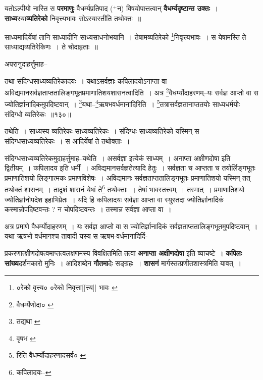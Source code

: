 \documentclass[article,12pt,a4paper]{memoir}
\newcommand{\add}[1]{($^{+}$#1)}
\begin{document}
	  \pstart यतोऽल्पीयो नास्ति स \textbf{परमाणुः} वैधर्म्यप्रतिपाद \add{न} विषयोपात्तत्वान् \textbf{वैधर्म्यदृष्टान्त उक्तः} । \textbf{साध्य}स्या\textbf{व्यतिरेको} निवृत्त्यभावः सोऽस्यास्तीति तथोक्तः ॥
	\pend
      \leavevmode{}
	  \bigskip
	  \begingroup
	

	  \pstart साध्यमादिर्येषां तानि साध्यादीनि साध्यसाधनोभयानि । तेषामव्यतिरेको \footnote{०रेको वृत्त्य० \cite{dp-msA} \cite{dp-edP} \cite{dp-edH} \cite{dp-edN} ०रेको निवृत्ता[[त्त्य]] भावः \cite{dp-msB}}निवृत्त्यभावः । स येषामस्ति ते साध्याद्यव्यतिरेकिणः । ते चोदाहृताः ॥
	\pend
       

	  \pstart अपरानुदाहर्त्तुमाह--
	\pend
       
	  \bigskip
	  \begingroup
	

	  \pstart तथा संदिग्धसाध्यव्यतिरेकादयः । यथाऽसर्वज्ञाः कपिलादयोऽनाप्ता वा अविद्यमानसर्वज्ञताप्ततालिङ्गभूतप्रमाणातिशयशासनत्वादिति । अत्र \footnote{वैधर्म्येणोदा० \cite{dp-msC}}वैधर्म्योदाहरणम्--यः सर्वज्ञ आप्तो वा स ज्योतिर्ज्ञानादिकमुपदिष्टवान् । \footnote{तद्यथा \cite{dp-msB} \cite{dp-msD} \cite{dp-edP} \cite{dp-edH} \cite{dp-edE} \cite{dp-edN}}यथा--\footnote{वृषभ \cite{dp-msC}}ऋषभवर्धमानादिरिति । \footnote{रिति वैधर्म्योदाहरणादसर्व० \cite{dp-msC}}तत्रासर्वज्ञतानाप्ततयोः साध्यधर्मयोः संदिग्धो व्यतिरेकः ॥१३०॥
	\pend
      
	  \endgroup
	 

	  \pstart तथेति । साध्यस्य व्यतिरेकः साध्यव्यतिरेकः । संदिग्धः साध्यव्यतिरेको यस्मिन् स संदिग्धसाध्यव्यतिरेकः । स आदिर्येषां ते तथोक्ताः ।
	\pend
       

	  \pstart संदिग्धसाध्यव्यतिरेकमुदाहर्त्तुमाह--यथेति । असर्वज्ञा इत्येकं साध्यम् । अनाप्ता अक्षीणदोषा इति द्वितीयम् । कपिलादय इति धर्मीं । अविद्यमानसर्वज्ञतेत्यादि हेतुः । सर्वज्ञता च आप्तता च तयोर्लिङ्गभूतः प्रमाणातिशयो लिङ्गात्मकः प्रमाणविशेषः । अविद्यमानः सर्वज्ञताप्ततालिङ्गभूतः प्रमाणातिशयो यस्मिन् तत् तथोक्तं शासनम् । तादृशं शासनं येषां ते\footnote{कपिलादयः--\cite{dp-msD-n}} तथोक्ताः । तेषां भावस्तत्त्वम् । तस्मात् । प्रमाणातिशयो ज्योतिर्ज्ञानोपदेश इहाभिप्रेतः । यदि हि कपिलादयः सर्वज्ञा आप्ता वा स्युस्तदा ज्योतिर्ज्ञानादिकं कस्मान्नोपदिष्टवन्तः ? न चोपदिष्टवन्तः । तस्मान्न सर्वज्ञा आप्ता वा ।
	\pend
       

	  \pstart अत्र प्रमाणे वैधर्म्योदाहरणम् । यः सर्वज्ञ आप्तो वा स ज्योतिर्ज्ञानादिकं सर्वज्ञताप्ततालिङ्गभूतमुपदिष्टवान् । यथा ऋषभो वर्धमानश्च तावादी यस्य स ऋषभ-वर्धमानादिर्दि-
	\pend
      
	  \endgroup
	

	  \pstart प्रकरणात्क्षीणदोषत्वमाप्तत्वलक्षणमस्य विवक्षितमिति तत्वा \textbf{अनाप्ता अक्षीणदोषा} इति व्याचष्टे । \textbf{कपिलः सांख्य}दर्शनकारो मुनिः । आदिशब्देन \textbf{गौतमा}देः सङ्ग्रहः । \textbf{शासनं} मार्गस्तत्प्रणीतशास्त्रमिति यावत् ।
	\pend
      
\end{document}

